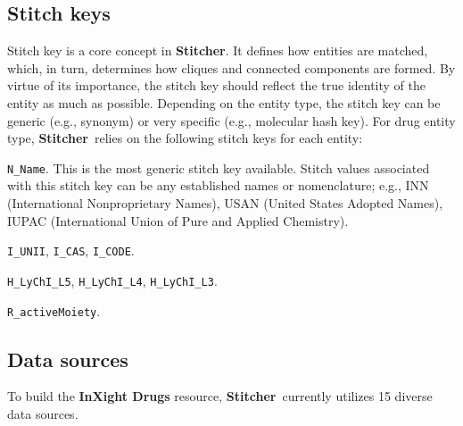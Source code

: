 \documentclass{bioinfo}
\newcommand\st{\textbf{Stitcher}}
\newcommand\ix{\textbf{InXight Drugs}}
\begin{document}
\subsection{Stitch keys}
Stitch key is a core concept in \st. It defines how entities are matched, which, in turn, determines how cliques and connected components are formed. By virtue of its importance, the stitch key should reflect the true identity of the entity as much as possible. Depending on the entity type, the stitch key can be generic (e.g., synonym) or very specific (e.g., molecular hash key). For drug entity type, \st\ relies on the following stitch keys for each entity:
\begin{unlist}
\item{\texttt{N\_Name}.} This is the most generic stitch key available. Stitch values associated with this stitch key can be any established names or nomenclature; e.g., INN (International Nonproprietary Names), USAN (United States Adopted Names), IUPAC (International Union of Pure and Applied Chemistry).
\item{\texttt{I\_UNII}, \texttt{I\_CAS}, \texttt{I\_CODE}.}
\item{\texttt{H\_LyChI\_L5}, \texttt{H\_LyChI\_L4}, \texttt{H\_LyChI\_L3}.}
\item{\texttt{R\_activeMoiety}.}
\end{unlist}

\subsection{Data sources}
To build the \ix{} resource, \st\ currently utilizes 15 diverse data sources.
\end{document}
